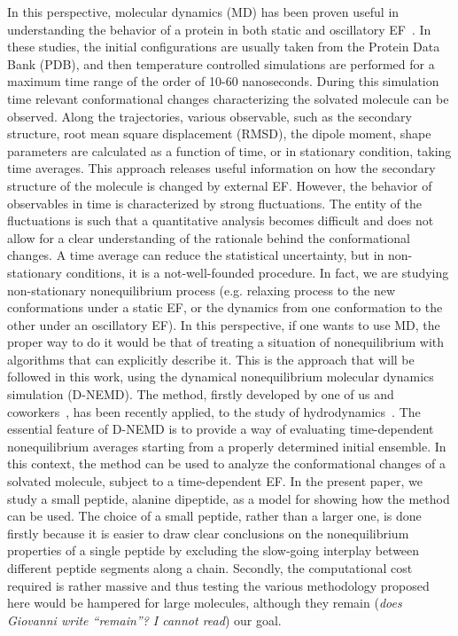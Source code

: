 \documentclass[a4paper,preprint,unsortedaddress,onecolumn]{revtex4-1}
\newcommand{\bluec}[1]{{\color{blue} #1}}
\begin{document}
In this perspective, molecular dynamics (MD) has been proven useful in
understanding the behavior of a protein 
in both static and oscillatory EF~\cite{budi2005electric, budi2007effect, budi2008comparative,
  toschi2008effects, astrakas2011electric, astrakas2012structural,
  damm2012can, starzyk2013proteins, english2009nonequilibrium,
  solomentsev2012effects}. In these studies, the initial
configurations are usually taken from the Protein Data Bank (PDB),
and then temperature controlled simulations are performed for a maximum
time range of the order of 10-60 nanoseconds.
During this simulation time 
relevant conformational changes characterizing the solvated molecule can be observed. 
Along the trajectories, various observable, such as the
secondary structure, root mean square displacement (RMSD), the dipole
moment, shape parameters are calculated as a function of time, or
in stationary condition, taking time averages.
This approach releases useful information on how the
secondary structure of the molecule is changed by external  EF.  However,
the behavior of observables in time is characterized by 
strong
fluctuations. The entity of the fluctuations is such that a quantitative 
analysis becomes difficult and does not allow for  a clear understanding of the rationale behind the conformational changes.
A time average can reduce the statistical uncertainty,
but in non-stationary conditions, it is a not-well-founded procedure.
In fact, we are studying non-stationary nonequilibrium process
(e.g. relaxing process to the new conformations under a static
EF, or the dynamics from one conformation to the other under an oscillatory EF).
In this perspective, if one wants to use MD, the proper way to do it would be that of treating a situation of nonequilibrium with algorithms that can explicitly describe it.
This is the approach that will be followed in this work, using
the dynamical nonequilibrium molecular dynamics simulation (D-NEMD).
The method, firstly developed by one of us and coworkers~\cite{ciccotti1975direct, ciccotti1979thought, ciccotti1993theoretical, palla2008bulk}, 
has been recently applied, to the study of
hydrodynamics~\cite{orlandini2011hydrodynamics,
  orlandini2011hydrodynamics-01}. The essential feature of D-NEMD is to
provide a way of evaluating time-dependent
nonequilibrium averages starting from a properly determined initial ensemble.
In this context, the method can be used to analyze the
conformational changes of a solvated molecule, subject to a time-dependent EF.
In the present paper, we study a small peptide, alanine dipeptide, as a model for showing how the method can be used. 
The choice of a small peptide, rather than a larger one, is done firstly because it
is easier to draw clear conclusions on the nonequilibrium properties
of a single peptide by excluding the slow-going interplay between
different peptide segments along a chain.
Secondly, the computational cost required is rather massive and thus  testing
the various methodology proposed here would be hampered for large molecules,
although they \bluec{remain (\textit{does Giovanni write ``remain''? I cannot read})} our goal.
\end{document}
